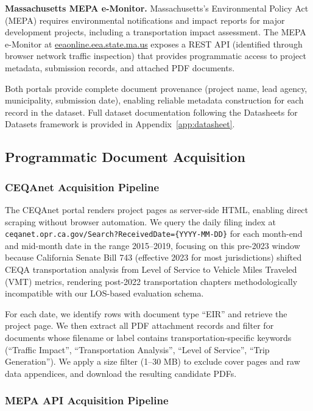 \documentclass[preprint,12pt]{elsarticle}
\begin{document}
\textbf{Massachusetts MEPA e-Monitor.}
Massachusetts's Environmental Policy Act (MEPA) requires environmental
notifications and impact reports for major development projects, including a
transportation impact assessment.
The MEPA e-Monitor at \url{eeaonline.eea.state.ma.us} exposes a REST API
(identified through browser network traffic inspection) that provides
programmatic access to project metadata, submission records, and attached
PDF documents.

Both portals provide complete document provenance (project name, lead agency,
municipality, submission date), enabling reliable metadata construction for
each record in the dataset.
Full dataset documentation following the Datasheets for Datasets framework
\citep{gebru2021datasheets} is provided in Appendix~\ref{app:datasheet}.

\subsection{Programmatic Document Acquisition}

\subsubsection{CEQAnet Acquisition Pipeline}

The CEQAnet portal renders project pages as server-side HTML, enabling direct
scraping without browser automation.
We query the daily filing index at
\texttt{ceqanet.opr.ca.gov/Search?ReceivedDate=\{YYYY-MM-DD\}} for each
month-end and mid-month date in the range 2015--2019, focusing on this
pre-2023 window because California Senate Bill 743 (effective 2023 for most
jurisdictions) shifted CEQA transportation analysis from Level of Service
to Vehicle Miles Traveled (VMT) metrics, rendering post-2022 transportation
chapters methodologically incompatible with our LOS-based evaluation schema.

For each date, we identify rows with document type ``EIR'' and retrieve the
project page.
We then extract all PDF attachment records and filter for documents whose
filename or label contains transportation-specific keywords
(``Traffic Impact'', ``Transportation Analysis'', ``Level of Service'',
``Trip Generation'').
We apply a size filter (1--30 MB) to exclude cover pages and raw data
appendices, and download the resulting candidate PDFs.

\subsubsection{MEPA API Acquisition Pipeline}
\end{document}
